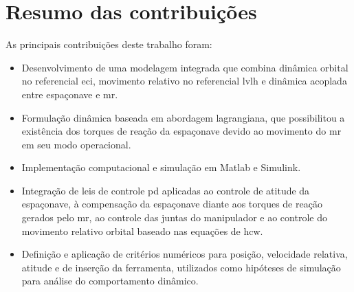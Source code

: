 \section{Resumo das contribuições}

As principais contribuições deste trabalho foram:

\begin{itemize}
    \item Desenvolvimento de uma modelagem integrada que combina dinâmica orbital no referencial \gls{eci}, movimento relativo no referencial \gls{lvlh} e dinâmica acoplada entre espaçonave e \gls{mr}.
    
    \item Formulação dinâmica baseada em abordagem lagrangiana, que possibilitou a existência dos torques de reação da espaçonave devido ao movimento do \gls{mr} em seu modo operacional.
    
    \item Implementação computacional e simulação em Matlab e Simulink.
    
    \item Integração de leis de controle \gls{pd} aplicadas ao controle de atitude da espaçonave, à compensação da espaçonave diante aos torques de reação gerados pelo \gls{mr}, ao controle das juntas do manipulador e ao controle do movimento relativo orbital baseado nas equações de \gls{hcw}.
    
    \item Definição e aplicação de critérios numéricos para posição, velocidade relativa, atitude e de inserção da ferramenta, utilizados como hipóteses de simulação para análise do comportamento dinâmico.
\end{itemize}